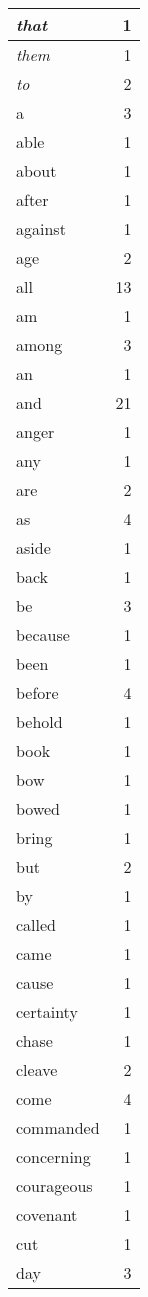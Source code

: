 \begin{center}
\begin{longtable}{l|r}
\emph{that} & 1\\ \hline 
\emph{them} & 1\\ \hline 
\emph{to} & 2\\ \hline 
a & 3\\ \hline 
able & 1\\ \hline 
about & 1\\ \hline 
after & 1\\ \hline 
against & 1\\ \hline 
age & 2\\ \hline 
all & 13\\ \hline 
am & 1\\ \hline 
among & 3\\ \hline 
an & 1\\ \hline 
and & 21\\ \hline 
anger & 1\\ \hline 
any & 1\\ \hline 
are & 2\\ \hline 
as & 4\\ \hline 
aside & 1\\ \hline 
back & 1\\ \hline 
be & 3\\ \hline 
because & 1\\ \hline 
been & 1\\ \hline 
before & 4\\ \hline 
behold & 1\\ \hline 
book & 1\\ \hline 
bow & 1\\ \hline 
bowed & 1\\ \hline 
bring & 1\\ \hline 
but & 2\\ \hline 
by & 1\\ \hline 
called & 1\\ \hline 
came & 1\\ \hline 
cause & 1\\ \hline 
certainty & 1\\ \hline 
chase & 1\\ \hline 
cleave & 2\\ \hline 
come & 4\\ \hline 
commanded & 1\\ \hline 
concerning & 1\\ \hline 
courageous & 1\\ \hline 
covenant & 1\\ \hline 
cut & 1\\ \hline 
day & 3\\ \hline 

\end{longtable}
\end{center}

